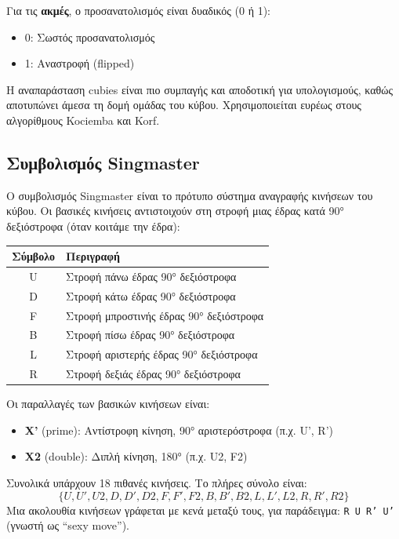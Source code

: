 Για τις \textbf{ακμές}, ο προσανατολισμός είναι δυαδικός (0 ή 1):
\begin{itemize}
    \item 0: Σωστός προσανατολισμός
    \item 1: Αναστροφή (flipped)
\end{itemize}

Η αναπαράσταση cubies είναι πιο συμπαγής και αποδοτική για υπολογισμούς, καθώς αποτυπώνει άμεσα τη δομή ομάδας του κύβου. Χρησιμοποιείται ευρέως στους αλγορίθμους Kociemba και Korf.

\subsection{Συμβολισμός Singmaster}
\label{subsec:singmaster}

Ο συμβολισμός Singmaster \cite{singmaster1981notes} είναι το πρότυπο σύστημα αναγραφής κινήσεων του κύβου. Οι βασικές κινήσεις αντιστοιχούν στη στροφή μιας έδρας κατά 90° δεξιόστροφα (όταν κοιτάμε την έδρα):

\begin{center}
\begin{tabular}{cl}
\toprule
\textbf{Σύμβολο} & \textbf{Περιγραφή} \\
\midrule
U & Στροφή πάνω έδρας 90° δεξιόστροφα \\
D & Στροφή κάτω έδρας 90° δεξιόστροφα \\
F & Στροφή μπροστινής έδρας 90° δεξιόστροφα \\
B & Στροφή πίσω έδρας 90° δεξιόστροφα \\
L & Στροφή αριστερής έδρας 90° δεξιόστροφα \\
R & Στροφή δεξιάς έδρας 90° δεξιόστροφα \\
\bottomrule
\end{tabular}
\end{center}

Οι παραλλαγές των βασικών κινήσεων είναι:
\begin{itemize}
    \item \textbf{X'} (prime): Αντίστροφη κίνηση, 90° αριστερόστροφα (π.χ. U', R')
    \item \textbf{X2} (double): Διπλή κίνηση, 180° (π.χ. U2, F2)
\end{itemize}

Συνολικά υπάρχουν 18 πιθανές κινήσεις. Το πλήρες σύνολο είναι:
\begin{equation*}
\{U, U', U2, D, D', D2, F, F', F2, B, B', B2, L, L', L2, R, R', R2\}
\end{equation*}
Μια ακολουθία κινήσεων γράφεται με κενά μεταξύ τους, για παράδειγμα: \texttt{R U R' U'} (γνωστή ως ``sexy move'').


